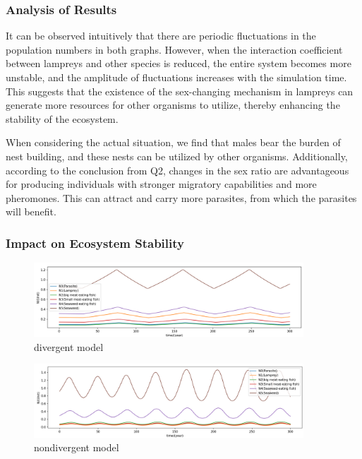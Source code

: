 \documentclass[12pt]{article}
\begin{document}
\subsubsection{Analysis of Results}

It can be observed intuitively that there are periodic fluctuations in the population numbers in
both graphs. However, when the interaction coefficient between lampreys and other species is
reduced, the entire system becomes more unstable, and the amplitude of fluctuations increases
with the simulation time. This suggests that the existence of the sex-changing mechanism in
lampreys can generate more resources for other organisms to utilize, thereby enhancing the
stability of the ecosystem.

When considering the actual situation, we find that males bear the burden of nest building, and
these nests can be utilized by other organisms. Additionally, according to the conclusion
from Q2, changes in the sex ratio are advantageous for producing individuals with stronger
migratory capabilities and more pheromones. This can attract and carry more parasites, from
which the parasites will benefit.

\subsubsection{Impact on Ecosystem Stability}
\begin{figure}[ht]
	\centering
	\includegraphics[width=0.9\textwidth]{Q3_divergent.png}
	\caption{divergent model}
\end{figure}
\begin{figure}[ht]
	\centering
	\includegraphics[width=0.9\textwidth]{Q3_nondivergence.png}
	\caption{nondivergent model}
\end{figure}
\end{document}
